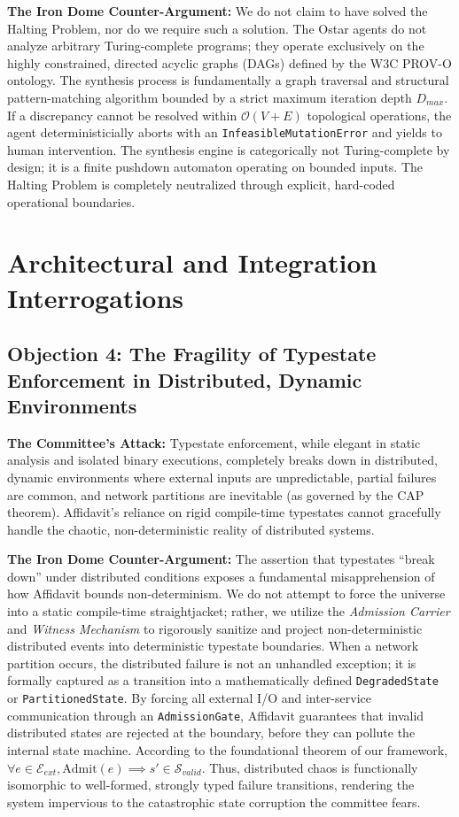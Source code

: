 \textbf{The Iron Dome Counter-Argument:} We do not claim to have solved the Halting Problem, nor do we require such a solution. The Ostar agents do not analyze arbitrary Turing-complete programs; they operate exclusively on the highly constrained, directed acyclic graphs (DAGs) defined by the W3C PROV-O ontology. The synthesis process is fundamentally a graph traversal and structural pattern-matching algorithm bounded by a strict maximum iteration depth $D_{max}$. If a discrepancy cannot be resolved within $\mathcal{O}(V + E)$ topological operations, the agent deterministicially aborts with an \texttt{InfeasibleMutationError} and yields to human intervention. The synthesis engine is categorically not Turing-complete by design; it is a finite pushdown automaton operating on bounded inputs. The Halting Problem is completely neutralized through explicit, hard-coded operational boundaries.

\section{Architectural and Integration Interrogations}

\subsection{Objection 4: The Fragility of Typestate Enforcement in Distributed, Dynamic Environments}
\textbf{The Committee's Attack:} Typestate enforcement, while elegant in static analysis and isolated binary executions, completely breaks down in distributed, dynamic environments where external inputs are unpredictable, partial failures are common, and network partitions are inevitable (as governed by the CAP theorem). Affidavit's reliance on rigid compile-time typestates cannot gracefully handle the chaotic, non-deterministic reality of distributed systems.

\textbf{The Iron Dome Counter-Argument:} The assertion that typestates ``break down'' under distributed conditions exposes a fundamental misapprehension of how Affidavit bounds non-determinism. We do not attempt to force the universe into a static compile-time straightjacket; rather, we utilize the \textit{Admission Carrier} and \textit{Witness Mechanism} to rigorously sanitize and project non-deterministic distributed events into deterministic typestate boundaries. When a network partition occurs, the distributed failure is not an unhandled exception; it is formally captured as a transition into a mathematically defined \texttt{DegradedState} or \texttt{PartitionedState}. By forcing all external I/O and inter-service communication through an \texttt{AdmissionGate}, Affidavit guarantees that invalid distributed states are rejected at the boundary, before they can pollute the internal state machine. According to the foundational theorem of our framework, $\forall e \in \mathcal{E}_{ext}, \text{Admit}(e) \implies s' \in \mathcal{S}_{valid}$. Thus, distributed chaos is functionally isomorphic to well-formed, strongly typed failure transitions, rendering the system impervious to the catastrophic state corruption the committee fears.


